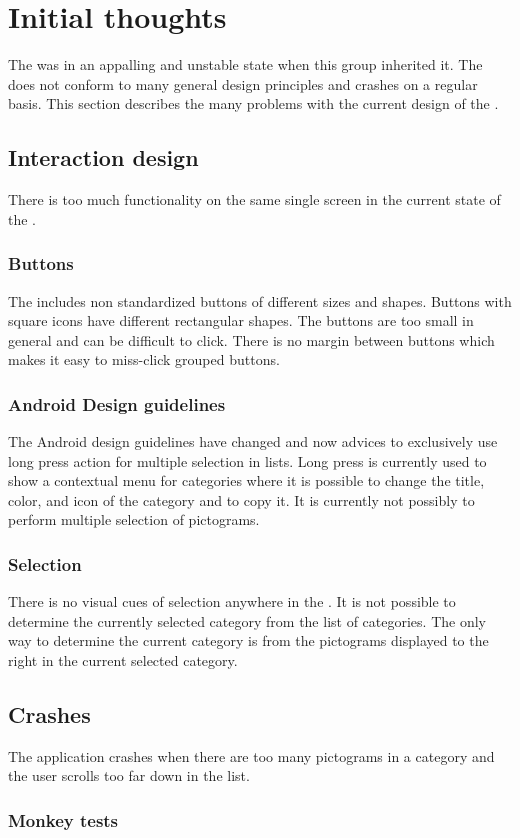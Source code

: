\section{Initial thoughts}

The \ct was in an appalling and unstable state when this group inherited it. The \ct does not conform to many general design principles and crashes on a regular basis. This section describes the many problems with the current design of the \ct.


\subsection{Interaction design}

There is too much functionality on the same single screen in the current state of the \ct. 

\subsubsection{Buttons}

The \ct includes non standardized buttons of different sizes and shapes. Buttons with square icons have different rectangular shapes. The buttons are too small in general and can be difficult to click. There is no margin between buttons which makes it easy to miss-click grouped buttons.    

\subsubsection{Android Design guidelines}

The Android design guidelines have changed and now advices to exclusively use long press action for multiple selection in lists. Long press is currently used to show a contextual menu for categories where it is possible to change the title, color, and icon of the category and to copy it. It is currently not possibly to perform multiple selection of pictograms. 

\subsubsection{Selection}

There is no visual cues of selection anywhere in the \ct. It is not possible to determine the currently selected category from the list of categories. The only way to determine the current category is from the pictograms displayed to the right in the current selected category. 

\subsection{Crashes}

The application crashes when there are too many pictograms in a category and the user scrolls too far down in the list. 

\subsubsection{Monkey tests}

